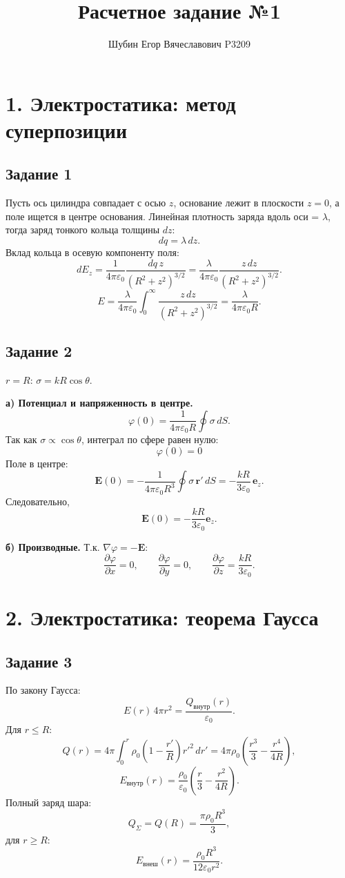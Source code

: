 \documentclass[12pt,a4paper]{article}
\title{Расчетное задание №1}
\author{Шубин Егор Вячеславович P3209}
\date{}
\begin{document}
\maketitle

\section*{1. Электростатика: метод суперпозиции}

\subsection*{Задание 1}
Пусть ось цилиндра совпадает с осью $z$, основание лежит в плоскости $z=0$, а поле ищется в центре основания.
Линейная плотность заряда вдоль оси = $\lambda$, тогда заряд тонкого кольца толщины $dz$:
\[
dq=\lambda\,dz.
\]
Вклад кольца в осевую компоненту поля:
\[
dE_z=\frac{1}{4\pi\varepsilon_0}\frac{dq\,z}{(R^2+z^2)^{3/2}}
=\frac{\lambda}{4\pi\varepsilon_0}\frac{z\,dz}{(R^2+z^2)^{3/2}}.
\]
\[
E=\frac{\lambda}{4\pi\varepsilon_0}\int_0^\infty \frac{z\,dz}{(R^2+z^2)^{3/2}}
=\frac{\lambda}{4\pi\varepsilon_0R}.
\]
\subsection*{Задание 2}
$r=R$: $\sigma=kR\cos\theta$.

\textbf{а) Потенциал и напряженность в центре.}
\[
\varphi(0)=\frac{1}{4\pi\varepsilon_0R}\oint \sigma\,dS.
\]
Так как $\sigma\propto \cos\theta$, интеграл по сфере равен нулю:
\[
\varphi(0)=0
\]
Поле в центре:
\[
\mathbf E(0)= -\frac{1}{4\pi\varepsilon_0R^3}\oint \sigma\,\mathbf r'\,dS
=-\frac{kR}{3\varepsilon_0}\,\mathbf e_z.
\]
Следовательно,
\[
\mathbf E(0)=-\frac{kR}{3\varepsilon_0}\mathbf e_z.
\]

\textbf{б) Производные.}
Т.к. $\nabla\varphi=-\mathbf E$:
\[
\frac{\partial\varphi}{\partial x}=0,\qquad
\frac{\partial\varphi}{\partial y}=0,\qquad
\frac{\partial\varphi}{\partial z}=\frac{kR}{3\varepsilon_0}.
\]

\section*{2. Электростатика: теорема Гаусса}

\subsection*{Задание 3}
По закону Гаусса:
\[
E(r)\,4\pi r^2=\frac{Q_{\text{внутр}}(r)}{\varepsilon_0}.
\]
Для $r\le R$:
\[
Q(r)=4\pi\int_0^r \rho_0\!\left(1-\frac{r'}{R}\right)r'^2\,dr'
=4\pi\rho_0\!\left(\frac{r^3}{3}-\frac{r^4}{4R}\right),
\]
\[
E_{\text{внутр}}(r)=\frac{\rho_0}{\varepsilon_0}\left(\frac r3-\frac{r^2}{4R}\right).
\]
Полный заряд шара:
\[
Q_\Sigma=Q(R)=\frac{\pi\rho_0R^3}{3},
\]
для $r\ge R$:
\[
E_{\text{внеш}}(r)=\frac{\rho_0R^3}{12\varepsilon_0r^2}.
\]
\end{document}
